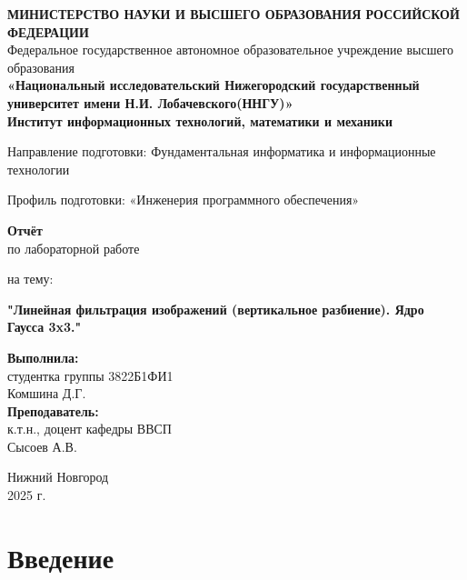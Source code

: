 \documentclass[12pt]{article}
\begin{document}
\begin{titlepage}
	\begin{center}
		\onehalfspacing
		\textbf{МИНИСТЕРСТВО НАУКИ И ВЫСШЕГО ОБРАЗОВАНИЯ РОССИЙСКОЙ ФЕДЕРАЦИИ} \\ 	[5pt]	
		Федеральное государственное автономное образовательное учреждение высшего образования \\  [5pt]	
		\textbf{«Национальный исследовательский Нижегородский государственный университет имени Н.И. Лобачевского(ННГУ)»} \\[5pt]

		\textbf{Институт информационных технологий, математики и механики}\\ 	[30pt]	

		\begin{center}
		Направление подготовки: Фундаментальная информатика и информационные технологии

		Профиль подготовки: «Инженерия программного обеспечения» \\ 	[50pt]	
		\end{center}

		\textbf{Отчёт}\\[0.5pt]
{ по лабораторной работе}

		на тему: 

			\textbf{"Линейная фильтрация изображений (вертикальное разбиение). Ядро Гаусса 3x3."}\\[60pt]


		\begin{flushright}
			\textbf{Выполнила:} \\
			студентка группы 3822Б1ФИ1 \\
			Комшина Д.Г. \\[20pt]


			\noindent\textbf{Преподаватель:} \\
			к.т.н., доцент кафедры ВВСП \\
			{Сысоев А.В.}
		\end{flushright}

		\vfill

		Нижний Новгород \\
		2025 г.
	\end{center}
\end{titlepage}

\newpage


\newpage

\section*{Введение}
\end{document}
